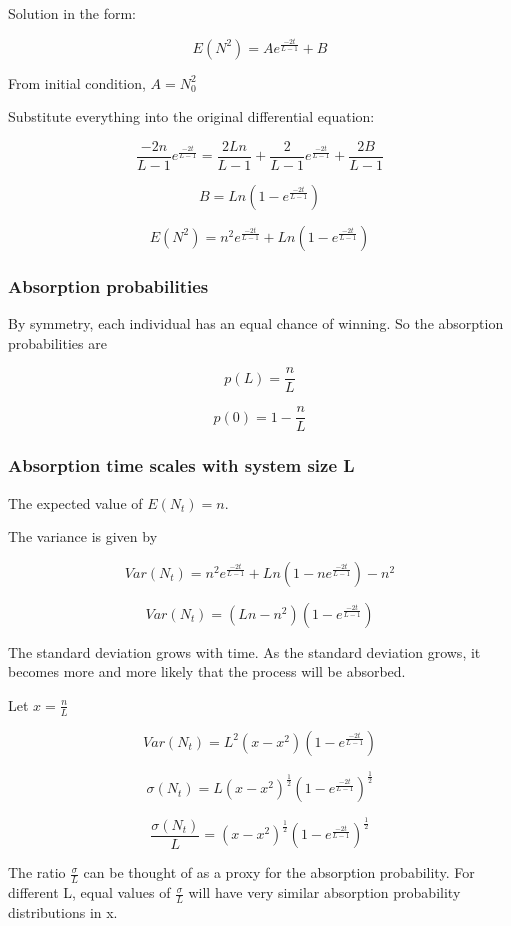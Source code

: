 \documentclass{article}
\begin{document}
Solution in the form:

$$E(N^2) = Ae^{\frac{-2t}{L-1}} + B$$

From initial condition, $A=N_0^2$

Substitute everything into the original differential equation:

$$\frac{-2n}{L-1}e^{\frac{-2t}{L-1}} = \frac{2Ln}{L-1} + \frac{2}{L-1}e^{\frac{-2t}{L-1}} + \frac{2B}{L-1}$$

$$B = Ln(1-e^{\frac{-2t}{L-1}})$$

$$E(N^2) = n^2e^{\frac{-2t}{L-1}} + Ln(1-e^{\frac{-2t}{L-1}})$$


\subsubsection{Absorption probabilities}

By symmetry, each individual has an equal chance of winning. So the absorption probabilities are

$$p(L) = \frac{n}{L}$$

$$p(0) = 1 - \frac{n}{L}$$



\subsubsection{Absorption time scales with system size L}

The expected value of $E(N_t)=n$.

The variance is given by 

$$Var(N_t) = n^2e^{\frac{-2t}{L-1}} + Ln(1-ne^{\frac{-2t}{L-1}}) - n^2$$

$$Var(N_t) = (Ln - n^2)(1- e^{\frac{-2t}{L-1}})$$

The standard deviation grows with time. As the standard deviation grows, it becomes more and more likely that the process will be absorbed. 

Let $x = \frac{n}{L}$

$$Var(N_t) = L^2 (x -x^2)(1- e^{\frac{-2t}{L-1}})$$

$$\sigma(N_t) = L (x -x^2)^{\frac{1}{2}}(1- e^{\frac{-2t}{L-1}})^{\frac{1}{2}}$$

$$\frac{\sigma(N_t)}{L} = (x -x^2)^{\frac{1}{2}}(1- e^{\frac{-2t}{L-1}})^{\frac{1}{2}}$$

The ratio $\frac{\sigma}{L}$ can be thought of as a proxy for the absorption probability. For different L, equal values of $\frac{\sigma}{L}$ will have very similar absorption probability distributions in x. 
\end{document}
